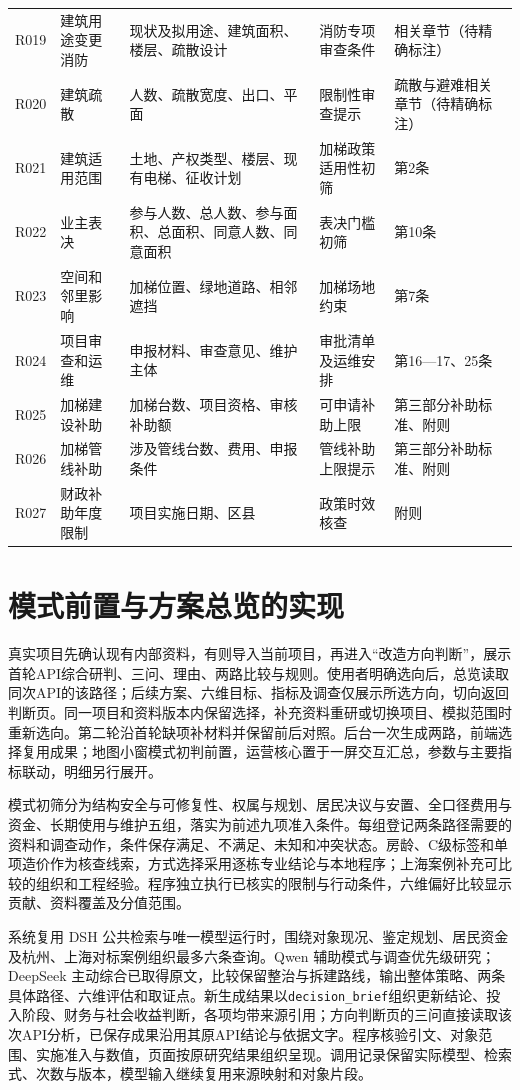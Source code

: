 \documentclass[UTF8,11pt,fontset=windows]{ctexart}
\begin{document}
{\begin{longtable}{@{}L{13mm}L{32mm}L{47mm}L{43mm}L{19mm}@{}}
R019 & 建筑用途变更消防 & 现状及拟用途、建筑面积、楼层、疏散设计 & 消防专项审查条件 & 相关章节（待精确标注）\\
R020 & 建筑疏散 & 人数、疏散宽度、出口、平面 & 限制性审查提示 & 疏散与避难相关章节（待精确标注）\\
R021 & 建筑适用范围 & 土地、产权类型、楼层、现有电梯、征收计划 & 加梯政策适用性初筛 & 第2条\\
R022 & 业主表决 & 参与人数、总人数、参与面积、总面积、同意人数、同意面积 & 表决门槛初筛 & 第10条\\
R023 & 空间和邻里影响 & 加梯位置、绿地道路、相邻遮挡 & 加梯场地约束 & 第7条\\
R024 & 项目审查和运维 & 申报材料、审查意见、维护主体 & 审批清单及运维安排 & 第16—17、25条\\
R025 & 加梯建设补助 & 加梯台数、项目资格、审核补助额 & 可申请补助上限 & 第三部分补助标准、附则\\
R026 & 加梯管线补助 & 涉及管线台数、费用、申报条件 & 管线补助上限提示 & 第三部分补助标准、附则\\
R027 & 财政补助年度限制 & 项目实施日期、区县 & 政策时效核查 & 附则\\
\bottomrule\end{longtable}
}

\section{模式前置与方案总览的实现}
真实项目先确认现有内部资料，有则导入当前项目，再进入“改造方向判断”，展示首轮API综合研判、三问、理由、两路比较与规则。使用者明确选向后，总览读取同次API的该路径；后续方案、六维目标、指标及调查仅展示所选方向，切向返回判断页。同一项目和资料版本内保留选择，补充资料重研或切换项目、模拟范围时重新选向。第二轮沿首轮缺项补材料并保留前后对照。后台一次生成两路，前端选择复用成果；地图小窗模式初判前置，运营核心置于一屏交互汇总，参数与主要指标联动，明细另行展开。

模式初筛分为结构安全与可修复性、权属与规划、居民决议与安置、全口径费用与资金、长期使用与维护五组，落实为前述九项准入条件。每组登记两条路径需要的资料和调查动作，条件保存满足、不满足、未知和冲突状态。房龄、C级标签和单项造价作为核查线索，方式选择采用逐栋专业结论与本地程序；上海案例补充可比较的组织和工程经验。程序独立执行已核实的限制与行动条件，六维偏好比较显示贡献、资料覆盖及分值范围。

系统复用 DSH 公共检索与唯一模型运行时，围绕对象现况、鉴定规划、居民资金及杭州、上海对标案例组织最多六条查询。Qwen 辅助模式与调查优先级研究；DeepSeek 主动综合已取得原文，比较保留整治与拆建路线，输出整体策略、两条具体路径、六维评估和取证点。新生成结果以\texttt{decision\_brief}组织更新结论、投入阶段、财务与社会收益判断，各项均带来源引用；方向判断页的三问直接读取该次API分析，已保存成果沿用其原API结论与依据文字。程序核验引文、对象范围、实施准入与数值，页面按原研究结果组织呈现。调用记录保留实际模型、检索式、次数与版本，模型输入继续复用来源映射和对象片段。
\end{document}
